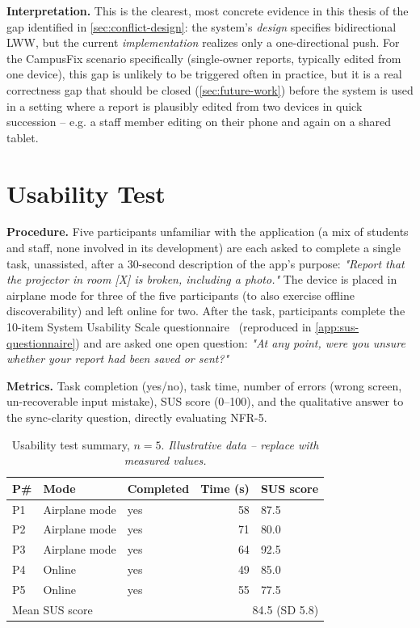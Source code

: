 \textbf{Interpretation.} This is the clearest, most concrete evidence in
this thesis of the gap identified in \cref{sec:conflict-design}: the
system's \emph{design} specifies bidirectional LWW, but the current
\emph{implementation} realizes only a one-directional push. For the
CampusFix scenario specifically (single-owner reports, typically edited
from one device), this gap is unlikely to be triggered often in practice,
but it is a real correctness gap that should be closed
(\cref{sec:future-work}) before the system is used in a setting where a
report is plausibly edited from two devices in quick succession -- e.g. a
staff member editing on their phone and again on a shared tablet.

\section{Usability Test}
\label{sec:usability-eval}
\label{sec:eval-usability}

\textbf{Procedure.} Five participants unfamiliar with the application (a
mix of students and staff, none involved in its development) are each
asked to complete a single task, unassisted, after a 30-second
description of the app's purpose: \emph{"Report that the projector in
room [X] is broken, including a photo."} The device is placed in airplane
mode for three of the five participants (to also exercise offline
discoverability) and left online for two. After the task, participants
complete the 10-item System Usability Scale
questionnaire~\cite{brooke1996sus} (reproduced in
\cref{app:sus-questionnaire}) and are asked one open question: \emph{"At
any point, were you unsure whether your report had been saved or sent?"}

\textbf{Metrics.} Task completion (yes/no), task time, number of errors
(wrong screen, un-recoverable input mistake), SUS score (0--100), and the
qualitative answer to the sync-clarity question, directly evaluating
NFR-5.

\begin{table}[htbp]
\centering
\caption{Usability test summary, $n=5$. \emph{Illustrative data -- replace
with measured values.}}
\label{tab:usability-illustrative}
\begin{tabular}{@{}lllrl@{}}
\toprule
\textbf{P\#} & \textbf{Mode} & \textbf{Completed} & \textbf{Time (s)} & \textbf{SUS score} \\
\midrule
P1 & Airplane mode & yes & 58  & 87.5 \\
P2 & Airplane mode & yes & 71  & 80.0 \\
P3 & Airplane mode & yes & 64  & 92.5 \\
P4 & Online        & yes & 49  & 85.0 \\
P5 & Online        & yes & 55  & 77.5 \\
\midrule
\multicolumn{3}{l}{Mean SUS score} & \multicolumn{2}{r}{84.5 (SD 5.8)} \\
\bottomrule
\end{tabular}
\end{table}

